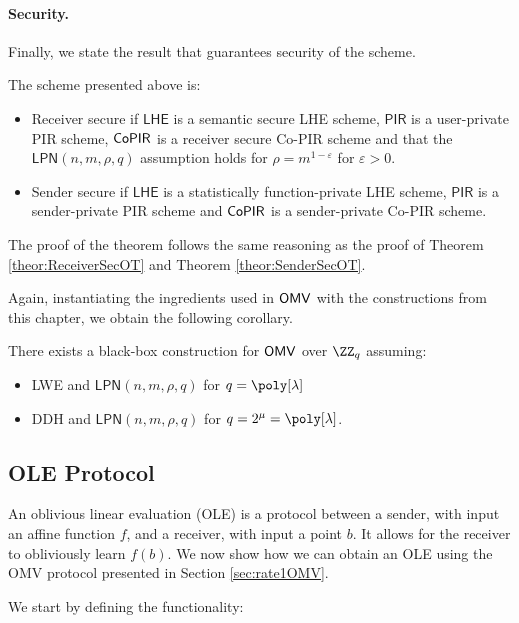 \paragraph{Security.} Finally, we state the result that guarantees security of the scheme. 
\begin{theorem}[Security]
The scheme presented above is:
\begin{itemize}
    \item Receiver secure if $\mathsf{LHE}$ is a semantic secure LHE scheme, $\mathsf{PIR}$ is a user-private PIR scheme, $\mathsf{CoPIR}$ is a receiver secure Co-PIR scheme and that the $\mathsf{LPN}(n,m,\rho,q)$ assumption holds for $\rho=m^{1-\varepsilon}$ for $\varepsilon>0$.
    \item Sender secure if $\mathsf{LHE}$ is a statistically function-private LHE scheme, $\mathsf{PIR}$ is a sender-private PIR scheme and $\mathsf{CoPIR}$ is a sender-private Co-PIR scheme.
\end{itemize}
\end{theorem}

The proof of the theorem follows the same reasoning as the proof of Theorem \ref{theor:ReceiverSecOT} and Theorem \ref{theor:SenderSecOT}.

Again, instantiating the ingredients used in $\mathsf{OMV}$ with the constructions from this chapter, we obtain the following corollary.
\begin{corollary}
There exists a black-box construction for $\mathsf{OMV}$ over $\ZZ_q$ assuming: 
\begin{itemize}
    \item LWE and $\mathsf{LPN}(n,m,\rho,q)$ for $q=\poly[\lambda]$
    \item DDH and $\mathsf{LPN}(n,m,\rho,q)$ for $q=2^\mu=\poly[\lambda]$.%
\end{itemize}
\end{corollary}


\subsection{OLE Protocol}
\label{sec:OLErate1fromOMV}
An oblivious linear evaluation (OLE) is a protocol between a sender, with input an affine function $f$, and a receiver, with input a point $b$. It allows for the receiver to obliviously learn $f(b)$. We now show how we can obtain an OLE using the OMV protocol presented in Section \ref{sec:rate1OMV}.

We start by defining the functionality:
